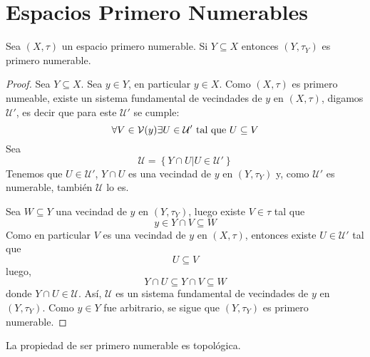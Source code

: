\documentclass[12pt]{report}
\theoremstyle{largebreak}
\begin{document}
    \section{Espacios Primero Numerables}

    \begin{propo}
        Sea $(X,\tau)$ un espacio primero numerable. Si $Y\subseteq X$ entonces $(Y,\tau_Y)$ es primero numerable.
    \end{propo}

    \begin{proof}
        Sea $Y\subseteq X$. Sea $y\in Y$, en particular $y\in X$. Como $(X,\tau)$ es primero numeable, existe un sistema fundamental de vecindades de $y$ en $(X,\tau)$, digamos $\mathcal{U}'$, es decir que para este $\mathcal{U}'$ se cumple:
        \begin{equation*}
            \forall V\in\mathcal{V}(y)\exists U\in\mathcal{U}'\textup{ tal que }U\subseteq V
        \end{equation*}
        Sea
        \begin{equation*}
            \mathcal{U}=\left\{Y\cap U\Big|U\in\mathcal{U}' \right\}
        \end{equation*}
        Tenemos que $U\in\mathcal{U}'$, $Y\cap U$ es una vecindad de $y$ en $(Y,\tau_Y)$ y, como $\mathcal{U}'$ es numerable, también $\mathcal{U}$ lo es.

        Sea $W\subseteq Y$ una vecindad de $y$ en $(Y,\tau_Y)$, luego existe $V\in\tau$ tal que
        \begin{equation*}
            y\in Y\cap V\subseteq W
        \end{equation*}
        Como en particular $V$ es una vecindad de $y$ en $(X,\tau)$, entonces existe $U\in\mathcal{U}'$ tal que
        \begin{equation*}
            U\subseteq V
        \end{equation*}
        luego,
        \begin{equation*}
            Y\cap U\subseteq Y\cap V\subseteq W
        \end{equation*} 
        donde $Y\cap U\in\mathcal{U}$. Así, $\mathcal{U}$ es un sistema fundamental de vecindades de $y$ en $(Y,\tau_Y)$. Como $y\in Y$ fue arbitrario, se sigue que $(Y,\tau_Y)$ es primero numerable.
    \end{proof}

    \begin{propo}
        La propiedad de ser primero numerable es topológica.
    \end{propo}
\end{document}
